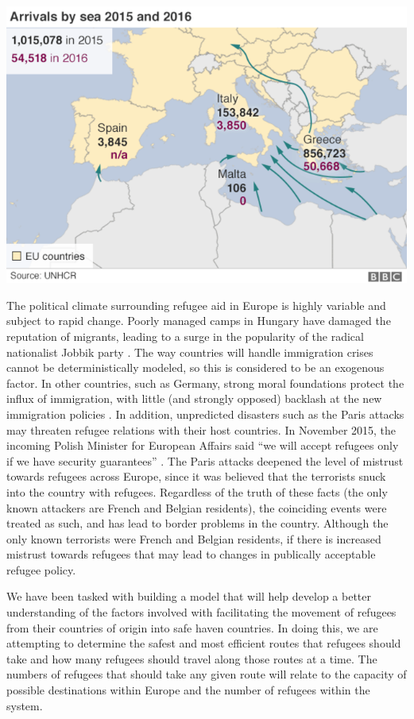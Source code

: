 \documentclass{article}
\begin{document}
\begin{center}
\includegraphics[scale=0.5]{travelmap}
\cite{BBCgraphics}
\end{center}

The political climate surrounding refugee aid in Europe is highly variable and subject to rapid change. Poorly managed camps in Hungary have damaged the reputation of migrants, leading to a surge in the popularity of the radical nationalist Jobbik party \cite{thorpe}. The way countries will handle immigration crises cannot be deterministically modeled, so this is considered to be an exogenous factor. In other countries, such as Germany, strong moral foundations protect the influx of immigration, with little (and strongly opposed) backlash at the new immigration policies \cite{hill}. In addition, unpredicted disasters such as the Paris attacks may threaten refugee relations with their host countries. In November 2015, the incoming Polish Minister for European Affairs said ``we will accept refugees only if we have security guarantees'' \cite{hewitt}. The Paris attacks deepened the level of mistrust towards refugees across Europe, since it was believed that the terrorists snuck into the country with refugees. Regardless of the truth of these facts (the only known attackers are French and Belgian residents), the coinciding events were treated as such, and has lead to border problems in the country. Although the only known terrorists were French and Belgian residents, if there is increased mistrust towards refugees that may lead to changes in publically acceptable refugee policy.

We have been tasked with building a model that will help develop a better understanding of the factors involved with facilitating the movement of refugees from their countries of origin into safe haven countries. In doing this, we are attempting to determine the safest and most efficient routes that refugees should take and how many refugees should travel along those routes at a time. The numbers of refugees that should take any given route will relate to the capacity of possible destinations within Europe and the number of refugees within the system. 
\end{document}
